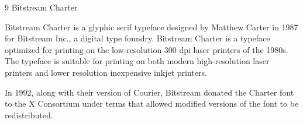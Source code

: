 \documentclass{article}
\begin{document}
\frenchspacing

{\LARGE 9 Bitstream Charter}

Bitstream Charter is a glyphic serif typeface designed by Matthew Carter in
1987 for Bitstream Inc., a digital type foundry.  Bitstream Charter is a
typeface optimized for printing on the low-resolution 300 dpi laser printers
of the 1980s.  The typeface is suitable for printing on both modern
high-resolution laser printers and lower resolution inexpensive inkjet
printers.

In 1992, along with their version of Courier, Bitstream donated the Charter
font to the X Consortium under terms that allowed modified versions of the
font to be redistributed.
\end{document}
